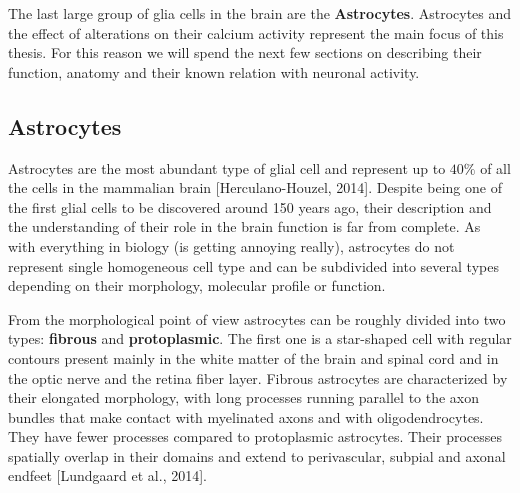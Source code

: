 The last large group of glia cells in the brain are the \textbf{Astrocytes}.
Astrocytes and the effect of alterations on their calcium activity represent the main focus of this thesis. 
For this reason we will spend the next few sections on describing their function, anatomy and their known relation with neuronal activity. 

\subsection{Astrocytes}
\label{chap1:sec:2:subsec1:astrocytes}
Astrocytes are the most abundant type of glial cell and represent up to $40\%$ of all the cells in the mammalian brain [Herculano-Houzel, 2014].
Despite being one of the first glial cells to be discovered around 150 years ago, their description and the understanding of their role in the brain function is far from complete.
As with everything in biology (is getting annoying really), astrocytes do not represent single homogeneous cell type and can be subdivided into several types depending on their morphology, molecular profile or function. 

From the morphological point of view astrocytes can be roughly divided into two types: \textbf{fibrous} and \textbf{protoplasmic}.
The first one is a star-shaped cell with regular contours present mainly in the white matter of the brain and spinal cord and in the optic nerve and the retina fiber layer.
Fibrous astrocytes are characterized by their elongated morphology, with long processes running parallel to the axon bundles that make contact with myelinated axons and with oligodendrocytes.
They have fewer processes compared to protoplasmic astrocytes.
Their processes spatially overlap in their domains and extend to perivascular, subpial and axonal endfeet [Lundgaard et al., 2014].

